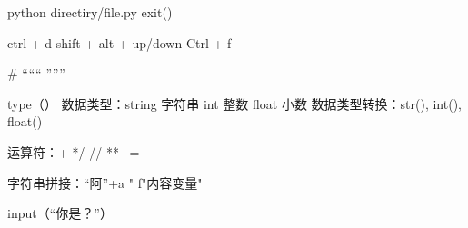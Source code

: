 python directiry/file.py %
exit()  %

ctrl + d %
shift + alt + up/down %
Ctrl + f %

#  %
“““     ”””   %
\ %

type（）  %
数据类型：string 字符串
          int    整数
          float  小数
数据类型转换：str(), int(), float()

运算符：+-*/  // %
              ** %
              ~= %

字符串拼接：“阿”+a 
            "  %
            f"内容{变量}"   %

input（“你是？”）  %
